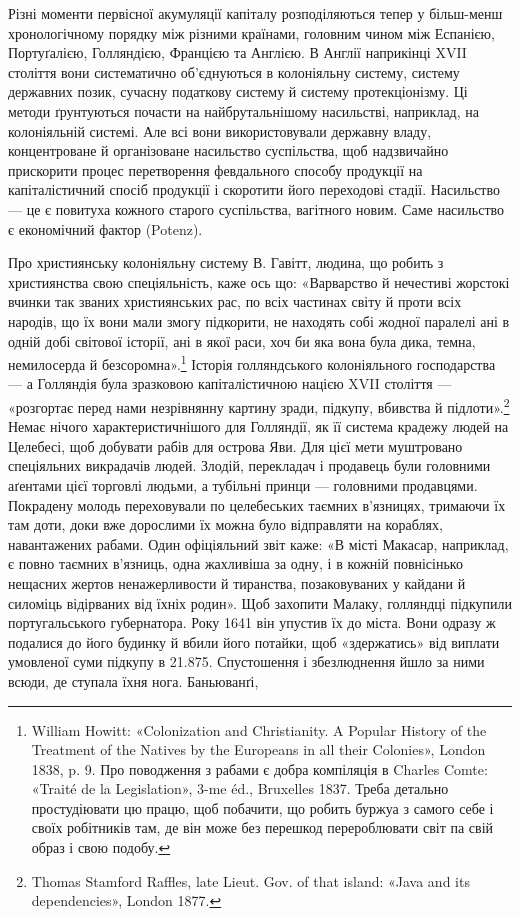 Різні моменти первісної акумуляції капіталу розподіляються
тепер у більш-менш хронологічному порядку між різними країнами,
головним чином між Еспанією, Портуґалією, Голляндією,
Францією та Англією. В Англії наприкінці XVII століття вони
систематично об’єднуються в колоніяльну систему, систему державних
позик, сучасну податкову систему й систему протекціонізму.
Ці методи ґрунтуються почасти на найбрутальнішому
насильстві, наприклад, на колоніяльній системі. Але всі вони
використовували державну владу, концентроване й організоване
насильство суспільства, щоб надзвичайно прискорити процес
перетворення февдального способу продукції на капіталістичний
спосіб продукції і скоротити його переходові стадії. Насильство —
це є повитуха кожного старого суспільства, вагітного новим.
Саме насильство є економічний фактор (Potenz).

Про християнську колоніяльну систему В. Гавітт, людина,
що робить з християнства свою спеціяльність, каже ось що:
«Варварство й нечестиві жорстокі вчинки так званих християнських
рас, по всіх частинах світу й проти всіх народів, що їх
вони мали змогу підкорити, не находять собі жодної паралелі
ані в одній добі світової історії, ані в якої раси, хоч би яка вона
була дика, темна, немилосерда й безсоромна».\footnote{
William Howitt: «Colonization and Christianity. A Popular History
of the Treatment of the Natives by the Europeans in all their Colonies»,
London 1838, p. 9. Про поводження з рабами є добра компіляція в Charles
Comte: «Traité de la Legislation», 3-me éd., Bruxelles 1837. Треба детально
простудіювати цю працю, щоб побачити, що робить буржуа з
самого себе і своїх робітників там, де він може без перешкод перероблювати
світ па свій образ і свою подобу.
} Історія голляндського
колоніяльного господарства — а Голляндія була
зразковою капіталістичною нацією XVII століття — «розгортає
перед нами незрівнянну картину зради, підкупу, вбивства
й підлоти».\footnote{
Thomas Stamford Raffles, late Lieut. Gov. of that island: «Java
and its dependencies», London 1877.
} Немає нічого характеристичнішого для Голляндії,
як її система крадежу людей на Целебесі, щоб добувати рабів
для острова Яви. Для цієї мети муштровано спеціяльних викрадачів
людей. Злодій, перекладач і продавець були головними аґентами
цієї торговлі людьми, а тубільні принци — головними продавцями.
Покрадену молодь переховували по целебеських таємних в’язницях,
тримаючи їх там доти, доки вже дорослими їх можна було
відправляти на кораблях, навантажених рабами. Один офіціяльний
звіт каже: «В місті Макасар, наприклад, є повно таємних в’язниць,
одна жахливіша за одну, і в кожній повнісінько нещасних
жертов ненажерливости й тиранства, позаковуваних у кайдани
й силоміць відірваних від їхніх родин». Щоб захопити Малаку,
голляндці підкупили португальського губернатора. Року 1641
він упустив їх до міста. Вони одразу ж подалися до його будинку
й вбили його потайки, щоб «здержатись» від виплати умовленої
суми підкупу в 21.875. Спустошення і збезлюднення
йшло за ними всюди, де ступала їхня нога. Баньюванґі,
\parbreak{}  %
